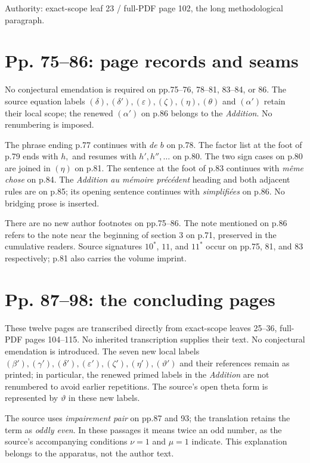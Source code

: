 \documentclass[11pt]{article}
\begin{document}
Authority: exact-scope leaf 23 / full-PDF page 102, the long methodological paragraph.

\section*{Pp. 75–86: page records and seams}
No conjectural emendation is required on pp.75–76, 78–81, 83–84, or 86. The
source equation labels $(\delta),(\delta'),(\varepsilon),(\zeta),(\eta),(\theta)$ and
$(\alpha')$ retain their local scope; the renewed $(\alpha')$ on p.86 belongs to the
\emph{Addition}. No renumbering is imposed.

The phrase ending p.77 continues with \emph{de $b$} on p.78. The factor list at
the foot of p.79 ends with $h,$ and resumes with $h',h'',\ldots$ on p.80.
The two sign cases on p.80 are joined in $(\eta)$ on p.81. The sentence at the
foot of p.83 continues with \emph{même chose} on p.84. The \emph{Addition au mémoire
précédent} heading and both adjacent rules are on p.85; its opening sentence
continues with \emph{simplifiées} on p.86. No bridging prose is inserted.

There are no new author footnotes on pp.75–86. The note mentioned on p.86
refers to the note near the beginning of section 3 on p.71, preserved in the
cumulative readers. Source signatures $10^*$, $11$, and $11^*$ occur on
pp.75, 81, and 83 respectively; p.81 also carries the volume imprint.


\newpage
\section*{Pp. 87–98: the concluding pages}
These twelve pages are transcribed directly from exact-scope leaves 25–36,
full-PDF pages 104–115. No inherited transcription supplies their text.
No conjectural emendation is introduced. The seven new local labels
$(\beta'),(\gamma'),(\delta'),(\varepsilon'),(\zeta'),(\eta'),(\vartheta')$
and their references remain as printed; in particular, the renewed primed
labels in the \emph{Addition} are not renumbered to avoid earlier repetitions.
The source's open theta form is represented by $\vartheta$ in these new labels.

The source uses \emph{impairement pair} on pp.87 and 93; the translation
retains the term as \emph{oddly even}. In these passages it means twice an odd
number, as the source's accompanying conditions $\nu=1$ and $\mu=1$ indicate.
This explanation belongs to the apparatus, not the author text.
\end{document}
